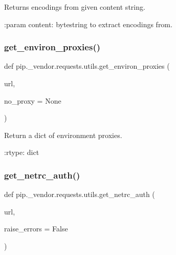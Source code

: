 \begin{DoxyVerb}Returns encodings from given content string.

:param content: bytestring to extract encodings from.
\end{DoxyVerb}
 \mbox{\label{namespacepip_1_1__vendor_1_1requests_1_1utils_a5263fd4ed9263e77ee4cdd19818a06a3}} 
\subsubsection{\texorpdfstring{get\+\_\+environ\+\_\+proxies()}{get\_environ\_proxies()}}
{\footnotesize\ttfamily def pip.\+\_\+vendor.\+requests.\+utils.\+get\+\_\+environ\+\_\+proxies (\begin{DoxyParamCaption}\item[{}]{url,  }\item[{}]{no\+\_\+proxy = {\ttfamily None} }\end{DoxyParamCaption})}

\begin{DoxyVerb}Return a dict of environment proxies.

:rtype: dict
\end{DoxyVerb}
 \mbox{\label{namespacepip_1_1__vendor_1_1requests_1_1utils_a5d3ffafa29cafc9f1bd209036b9b8277}} 
\subsubsection{\texorpdfstring{get\+\_\+netrc\+\_\+auth()}{get\_netrc\_auth()}}
{\footnotesize\ttfamily def pip.\+\_\+vendor.\+requests.\+utils.\+get\+\_\+netrc\+\_\+auth (\begin{DoxyParamCaption}\item[{}]{url,  }\item[{}]{raise\+\_\+errors = {\ttfamily False} }\end{DoxyParamCaption})}


